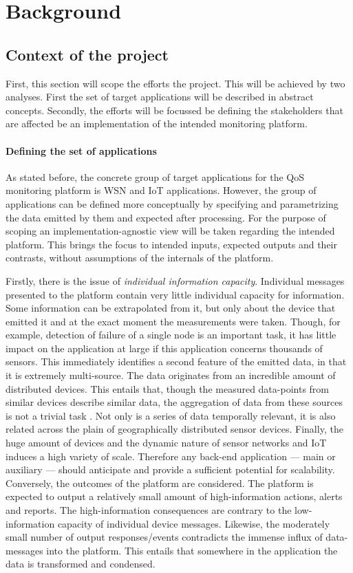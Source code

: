 \chapter{Background}
\label{ch:back}
\section{Context of the project}
\label{sec:back:context}
First, this section will scope the efforts the project. This will be achieved by two analyses. First the set of target applications will be described in abstract concepts. Secondly, the efforts will be focussed  be defining the stakeholders that are affected be an implementation of the intended monitoring platform. 

\subsubsection*{Defining the set of applications}
As stated before, the concrete group of target applications for the QoS monitoring platform is WSN and IoT applications. However, the group of applications can be defined more conceptually by specifying and parametrizing the data emitted by them and expected after processing. For the purpose of scoping an implementation-agnostic view will be taken regarding the intended platform. This brings the focus to intended inputs, expected outputs and their contrasts, without assumptions of the internals of the platform.

Firstly, there is the issue of \emph{individual information capacity}. Individual messages presented to the platform contain very little individual capacity for information. Some information can be extrapolated from it, but only about the device that emitted it and at the exact moment the measurements were taken. Though, for example, detection of failure of a single node is an important task, it has little impact on the application at large if this application concerns thousands of sensors. This immediately identifies a second feature of the emitted data, in that it is extremely multi-source. The data originates from an incredible amount of distributed devices. This entails that, though the measured data-points from similar devices describe similar data, the aggregation of data from these sources is not a trivial task \cite{iot_big_data_difficulties}. Not only is a series of data temporally relevant, it is also related across the plain of geographically distributed sensor devices. Finally, the huge amount of devices and the dynamic nature of sensor networks and IoT induces a high variety of scale. Therefore any back-end application --- main or auxiliary --- should anticipate and provide a sufficient potential for scalability. Conversely, the outcomes of the platform are considered. The platform is expected to output a relatively small amount of high-information actions, alerts and reports. The high-information consequences are contrary to the low-information capacity of individual device messages. Likewise, the moderately small number of output responses/events contradicts the immense influx of data-messages into the platform. This entails that somewhere in the application the data is transformed and condensed.

